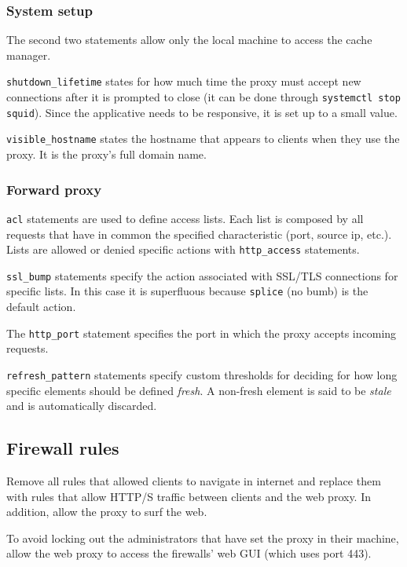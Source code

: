 \documentclass[draft]{homework}
\begin{document}
    \subsubsection{System setup}
    The second two statements allow only the local machine to access the cache manager.
    
    \texttt{shutdown\_lifetime} states for how much time the proxy must accept new connections after it is prompted to close (it can be done through \texttt{systemctl stop squid}).
    Since the applicative needs to be responsive, it is set up to a small value.
    
    \texttt{visible\_hostname} states the hostname that appears to clients when they use the proxy.
    It is the proxy's full domain name.
    
    \subsubsection{Forward proxy}
    \texttt{acl} statements are used to define access lists.
    Each list is composed by all requests that have in common the specified characteristic (port, source ip, etc.).
    Lists are allowed or denied specific actions with \texttt{http\_access} statements.
    
    \texttt{ssl\_bump} statements specify the action associated with SSL/TLS connections for specific lists.
    In this case it is superfluous because \texttt{splice} (no bumb) is the default action.
    
    The \texttt{http\_port} statement specifies the port in which the proxy accepts incoming requests.
    
    \texttt{refresh\_pattern} statements specify custom thresholds for deciding for how long specific elements should be defined \textit{fresh}.
    A non-fresh element is said to be \textit{stale} and is automatically discarded.
    
    \subsection{Firewall rules}
    Remove all rules that allowed clients to navigate in internet and replace them with rules that allow HTTP/S traffic between clients and the web proxy.
    In addition, allow the proxy to surf the web.
    
    To avoid locking out the administrators that have set the proxy in their machine, allow the web proxy to access the firewalls' web GUI (which uses port 443).
    
\end{document}
